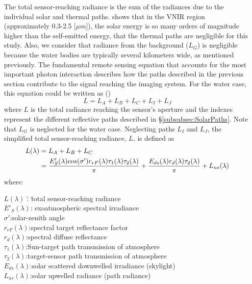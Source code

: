 The total sensor-reaching radiance is the sum of the radiances due to the individual solar and thermal paths.  \cite{Schott} shows that in the VNIR region (approximately 0.3-2.5 [$\mu m$]), the solar energy is so many orders of magnitude higher than the self-emitted energy, that the thermal paths are negligible for this study. Also, we consider that radiance from the background ($L_G$) is negligible because the water bodies are typically several kilometers wide, as mentioned previously. The fundamental remote sensing equation that accounts for the most important photon interaction describes how the paths described in the previous section contribute to the signal reaching the imaging system. For the water case, this equation could be written as (\cite{Schott})
\begin{equation}
   L = L_A+L_B+L_C+L_I+L_J
\end{equation} 
where $L$ is the total radiance reaching the sensor's aperture and the indexes represent the different reflective paths described in \S\ref{subsubsec:SolarPaths}. Note that $L_G$ is neglected for the water case. Neglecting paths $L_I$ and $L_J$, the simplified total sensor-reaching radiance, $L$, is defined as 
\begin{align} \label{eq:gov1} 
L(\lambda)  &=L_A+L_B+L_C\notag\\
            &= \frac{E'_S(\lambda)cos(\sigma')r_{rF}(\lambda)\tau_1(\lambda)\tau_2(\lambda)}{\pi} + \frac{E_{ds}(\lambda)r_d(\lambda)\tau_2(\lambda)}{\pi} + L_{us}(\lambda)
\end{align} 
where:
\begin{tabbing}
\indent \indent \indent  $L(\lambda)$ \hspace{1mm}\=:  \indent \= total sensor-reaching radiance\\
\indent \indent \indent  $E'_S(\lambda)$\>: \>exoatmospheric spectral irradiance\\
\indent \indent \indent $\sigma'$\>:\>solar-zenith angle\\
\indent \indent \indent $r_{rF}(\lambda)$\>:\>spectral target reflectance factor\\
\indent \indent \indent $r_d(\lambda)$\>:\>spectral diffuse reflectance\\
\indent \indent \indent $\tau_1(\lambda)$\>:\>Sun-target path transmission of atmosphere\\
\indent \indent \indent $\tau_2(\lambda)$\>:\>target-sensor path transmission of atmosphere\\
\indent \indent \indent $E_{ds}(\lambda)$\>:\>solar scattered downwelled irradiance (skylight)\\
\indent \indent \indent $L_{us}(\lambda)$\>:\>solar upwelled radiance (path radiance)\\
\end{tabbing}
